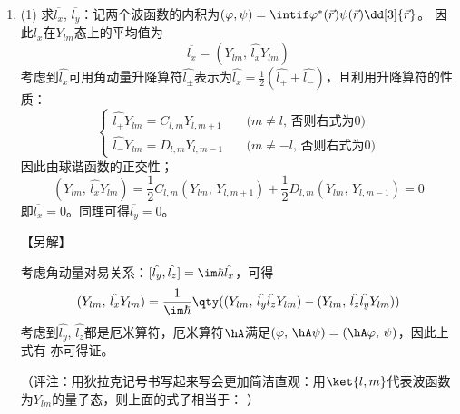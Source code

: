 \begin{enumerate}[label=2.\arabic*]
\item
(1) 求$\overline{l_x}$, $\overline{l_y}$：记两个波函数的内积为$(\varphi, \psi) = \intif \varphi^*(\vec{r})\psi(\vec{r}) \dd[3]{\vec{r}}$。
因此$l_x$在$Y_{lm}$态上的平均值为
\[\overline{l_x} = (Y_{lm},\,\hat{l_x}Y_{lm})\]
考虑到$\hat{l_x}$可用角动量升降算符$\hat{l_\pm}$表示为$\hat{l_x}=\frac{1}{2}(\hat{l_+}+\hat{l_-})$，且利用升降算符的性质：
\[\begin{cases}
\hat{l_+}Y_{lm} = C_{l,m}Y_{l,m+1}\quad&\text{($m\neq l$, 否则右式为0)}\\
\hat{l_-}Y_{lm} = D_{l,m}Y_{l,m-1}\quad&\text{($m\neq -l$, 否则右式为0)}
\end{cases}
\]
因此由球谐函数的正交性；
\[(Y_{lm},\,\hat{l_x}Y_{lm}) = \frac{1}{2}C_{l,m}(Y_{lm},\,Y_{l,m+1})+\frac{1}{2} D_{l,m}(Y_{lm},\,Y_{l,m-1})=0\]
即$\overline{l_x}=0$。同理可得$\overline{l_y}=0$。

【另解】

考虑角动量对易关系：$[\hat{l_y},\hat{l_z}]=\im\hbar \hat{l_x}$，可得
\[(Y_{lm},\,\hat{l_x}Y_{lm}) =\frac{1}{\im\hbar}\qty((Y_{lm},\,\hat{l_y}\hat{l_z}Y_{lm})-(Y_{lm},\,\hat{l_z}\hat{l_y}Y_{lm}))\]
考虑到$\hat{l_y}$, $\hat{l_z}$都是厄米算符，厄米算符$\hA$满足$(\varphi,\,\hA\psi)=(\hA\varphi,\,\psi)$，因此上式有
亦可得证。

（评注：用狄拉克记号书写起来写会更加简洁直观：用$\ket{l,m}$代表波函数为$Y_{lm}$的量子态，则上面的式子相当于：
）


\end{enumerate}
